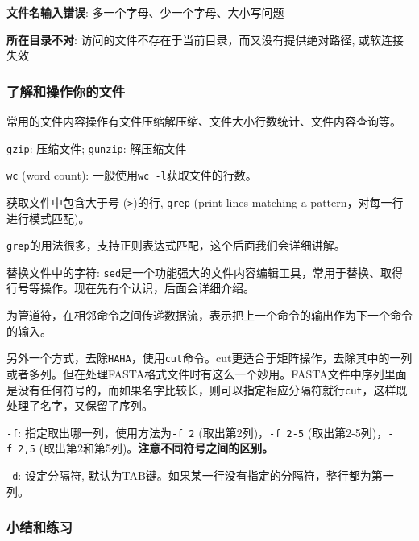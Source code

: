 \documentclass[]{article}
\numberwithin{figure}{section}
\numberwithin{table}{section}
\begin{document}
\textbf{文件名输入错误}: 多一个字母、少一个字母、大小写问题

\textbf{所在目录不对}: 访问的文件不存在于当前目录，而又没有提供绝对路径, 或软连接失效

\hypertarget{file_op_gzip_wc}{%
\subsubsection{了解和操作你的文件}\label{file_op_gzip_wc}}

常用的文件内容操作有文件压缩解压缩、文件大小行数统计、文件内容查询等。

\texttt{gzip}: 压缩文件; \texttt{gunzip}: 解压缩文件

\texttt{wc} (word count): 一般使用\texttt{wc\ -l}获取文件的行数。

获取文件中包含大于号 (\texttt{\textgreater{}})的行, \texttt{grep} (print lines matching a pattern，对每一行进行模式匹配)。

\texttt{grep}的用法很多，支持正则表达式匹配，这个后面我们会详细讲解。

替换文件中的字符: \texttt{sed}是一个功能强大的文件内容编辑工具，常用于替换、取得行号等操作。现在先有个认识，后面会详细介绍。

\texttt{\textbar{}} 为管道符，在相邻命令之间传递数据流，表示把上一个命令的输出作为下一个命令的输入。

另外一个方式，去除\texttt{HAHA}，使用\texttt{cut}命令。cut更适合于矩阵操作，去除其中的一列或者多列。但在处理FASTA格式文件时有这么一个妙用。FASTA文件中序列里面是没有任何符号的，而如果名字比较长，则可以指定相应分隔符就行\texttt{cut}，这样既处理了名字，又保留了序列。

\texttt{-f}: 指定取出哪一列，使用方法为\texttt{-f\ 2} (取出第2列)，\texttt{-f\ 2-5} (取出第2-5列)，\texttt{-f\ 2,5} (取出第2和第5列)。\textbf{注意不同符号之间的区别。}

\texttt{-d}: 设定分隔符, 默认为TAB键。如果某一行没有指定的分隔符，整行都为第一列。

\hypertarget{second_exercise}{%
\subsubsection{小结和练习}\label{second_exercise}}
\end{document}
